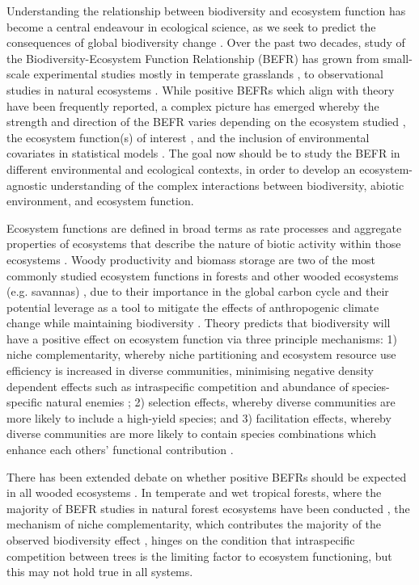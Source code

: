\documentclass[11pt,a4paper]{article}
\begin{document}
Understanding the relationship between biodiversity and ecosystem function has become a central endeavour in ecological science, as we seek to predict the consequences of global biodiversity change \citep{Naeem2012}. Over the past two decades, study of the Biodiversity-Ecosystem Function Relationship (BEFR) has grown from small-scale experimental studies mostly in temperate grasslands \citep{Cardinale2009, Tilman1994, Tilman2014}, to observational studies in natural ecosystems \citep{Plas2019}. While positive BEFRs which align with theory have been frequently reported, a complex picture has emerged whereby the strength and direction of the BEFR varies depending on the ecosystem studied \citep{Liang2016}, the ecosystem function(s) of interest \citep{Hector2007}, and the inclusion of environmental covariates in statistical models \citep{Vila2005}. The goal now should be to study the BEFR in different environmental and ecological contexts, in order to develop an ecosystem-agnostic understanding of the complex interactions between biodiversity, abiotic environment, and ecosystem function.

Ecosystem functions are defined in broad terms as rate processes and aggregate properties of ecosystems that describe the nature of biotic activity within those ecosystems \citep{Jax2005}. Woody productivity and biomass storage are two of the most commonly studied ecosystem functions in forests and other wooded ecosystems (e.g. savannas) \citep{Brockerhoff2017}, due to their importance in the global carbon cycle \citep{Pan2011} and their potential leverage as a tool to mitigate the effects of anthropogenic climate change while maintaining biodiversity \citep{Pichancourt2013}. Theory predicts that biodiversity will have a positive effect on ecosystem function via three principle mechanisms: 1) niche complementarity, whereby niche partitioning and ecosystem resource use efficiency is increased in diverse communities, minimising negative density dependent effects such as intraspecific competition and abundance of species-specific natural enemies \citep{Barry2019}; 2) selection effects, whereby diverse communities are more likely to include a high-yield species; and 3) facilitation effects, whereby diverse communities are more likely to contain species combinations which enhance each others' functional contribution \citep{Wright2017}. 

There has been extended debate on whether positive BEFRs should be expected in all wooded ecosystems \citep{Liang2016}. In temperate and wet tropical forests, where the majority of BEFR studies in natural forest ecosystems have been conducted \citep{Plas2019}, the mechanism of niche complementarity, which contributes the majority of the observed biodiversity effect \citep{Poorter2015, Sande2017a, Wright2017}, hinges on the condition that intraspecific competition between trees is the limiting factor to ecosystem functioning, but this may not hold true in all systems. 
\end{document}
